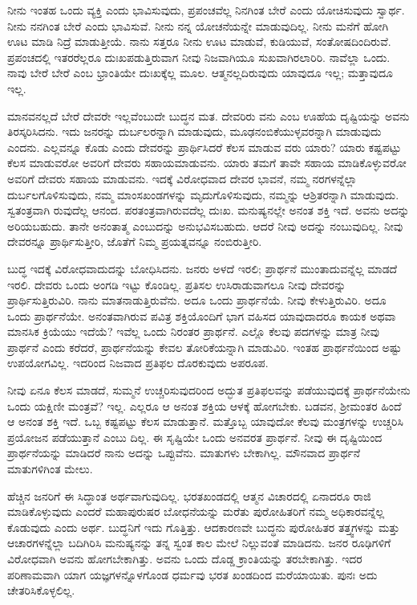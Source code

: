 ನೀನು ಇಂತಹ ಒಂದು ವ್ಯಕ್ತಿ ಎಂದು ಭಾವಿಸುವುದು, ಪ್ರಪಂಚವೆಲ್ಲ ನಿನಗಿಂತ ಬೇರೆ ಎಂದು ಯೋಚಿಸುವುದು ಸ್ವಾರ್ಥ. ನೀನು ನನಗಿಂತ ಬೇರೆ ಎಂದು ಭಾವಿಸುವೆ. ನೀನು ನನ್ನ ಯೋಚನೆಯನ್ನೇ ಮಾಡುವುದಿಲ್ಲ. ನೀನು ಮನೆಗೆ ಹೋಗಿ ಊಟ ಮಾಡಿ ನಿದ್ರೆ ಮಾಡುತ್ತೀಯೆ. ನಾನು ಸತ್ತರೂ ನೀನು ಊಟ ಮಾಡುವೆ, ಕುಡಿಯುವೆ, ಸಂತೋಷದಿಂದಿರುವೆ. ಪ್ರಪಂಚದಲ್ಲಿ ಇತರರೆಲ್ಲರೂ ದುಃಖಪಡುತ್ತಿರುವಾಗ ನೀವು ನಿಜವಾಗಿಯೂ ಸುಖವಾಗಿರಲಾರಿರಿ. ನಾವೆಲ್ಲಾ ಒಂದು. ನಾವು ಬೇರೆ ಬೇರೆ ಎಂಬ ಭ್ರಾಂತಿಯೇ ದುಃಖಕ್ಕೆಲ್ಲ ಮೂಲ. ಆತ್ಮನಲ್ಲದಿರುವುದು ಯಾವುದೂ ಇಲ್ಲ; ಮತ್ತಾವುದೂ ಇಲ್ಲ.

ಮಾನವನಲ್ಲದೆ ಬೇರೆ ದೇವರೇ ಇಲ್ಲವೆಂಬುದೇ ಬುದ್ಧನ ಮತ. ದೇವರಿರು ವನು ಎಂಬ ಊಹೆಯ ದೃಷ್ಟಿಯನ್ನು ಅವನು ತಿರಸ್ಕರಿಸಿದನು. ಇದು ಜನರನ್ನು ದುರ್ಬಲರನ್ನಾಗಿ ಮಾಡುವುದು, ಮೂಢನಂಬಿಕೆಯುಳ್ಳವರನ್ನಾಗಿ ಮಾಡುವುದು ಎಂದನು. ಎಲ್ಲವನ್ನೂ ಕೊಡು ಎಂದು ದೇವರನ್ನು ಪ್ರಾರ್ಥಿಸಿದರೆ ಕೆಲಸ ಮಾಡುವ ವರು ಯಾರು? ಯಾರು ಕಷ್ಟಪಟ್ಟು ಕೆಲಸ ಮಾಡುವರೋ ಅವರಿಗೆ ದೇವರು ಸಹಾಯಮಾಡುವನು. ಯಾರು ತಮಗೆ ತಾವೇ ಸಹಾಯ ಮಾಡಿಕೊಳ್ಳುವರೋ ಅವರಿಗೆ ದೇವರು ಸಹಾಯ ಮಾಡುವನು. ಇದಕ್ಕೆ ವಿರೋಧವಾದ ದೇವರ ಭಾವನೆ, ನಮ್ಮ ನರಗಳನ್ನೆಲ್ಲಾ ದುರ್ಬಲಗೊಳಿಸುವುದು, ನಮ್ಮ ಮಾಂಸಖಂಡಗಳನ್ನು ಮೃದುಗೊಳಿಸುವುದು, ನಮ್ಮನ್ನು ಆಶ್ರಿತರನ್ನಾಗಿ ಮಾಡುವುದು. ಸ್ವತಂತ್ರವಾಗಿ ರುವುದೆಲ್ಲ ಆನಂದ. ಪರತಂತ್ರವಾಗಿರುವದೆಲ್ಲ ದುಃಖ. ಮನುಷ್ಯನಲ್ಲೇ ಅನಂತ ಶಕ್ತಿ ಇದೆ. ಅವನು ಅದನ್ನು ಅರಿಯಬಹುದು. ತಾನೇ ಅನಂತಾತ್ಮ ಎಂಬುದನ್ನು ಅನುಭವಿಸಬಹುದು. ಆದರೆ ನೀವು ಅದನ್ನು ನಂಬುವುದಿಲ್ಲ. ನೀವು ದೇವರನ್ನೂ ಪ್ರಾರ್ಥಿಸುತ್ತೀರಿ, ಜೊತೆಗೆ ನಿಮ್ಮ ಪ್ರಯತ್ನವನ್ನೂ ನಂಬಿರುತ್ತೀರಿ.

ಬುದ್ಧ ಇದಕ್ಕೆ ವಿರೋಧವಾದುದನ್ನು ಬೋಧಿಸಿದನು. ಜನರು ಅಳದೆ ಇರಲಿ; ಪ್ರಾರ್ಥನೆ ಮುಂತಾದುವನ್ನೆಲ್ಲ ಮಾಡದೆ ಇರಲಿ. ದೇವರು ಒಂದು ಅಂಗಡಿ ಇಟ್ಟು ಕೊಂಡಿಲ್ಲ. ಪ್ರತಿಸಲ ಉಸಿರಾಡುವಾಗಲೂ ನೀವು ದೇವರನ್ನು ಪ್ರಾರ್ಥಿಸುತ್ತಿರುವಿರಿ. ನಾನು ಮಾತನಾಡುತ್ತಿರುವೆನು. ಅದೂ ಒಂದು ಪ್ರಾರ್ಥನೆಯೆ. ನೀವು ಕೇಳುತ್ತಿರುವಿರಿ. ಅದೂ ಒಂದು ಪ್ರಾರ್ಥನೆಯೇ. ಅನಂತವಾಗಿರುವ ಪವಿತ್ರ ಶಕ್ತಿಯೊಂದಿಗೆ ಭಾಗ ವಹಿಸದ ಯಾವುದಾದರೂ ಕಾಯಕ ಅಥವಾ ಮಾನಸಿಕ ಕ್ರಿಯೆಯು ಇದೆಯೆ? ಇವೆಲ್ಲ ಒಂದು ನಿರಂತರ ಪ್ರಾರ್ಥನೆ. ಎಲ್ಲೊ ಕೆಲವು ಪದಗಳನ್ನು ಮಾತ್ರ ನೀವು ಪ್ರಾರ್ಥನೆ ಎಂದು ಕರೆದರೆ, ಪ್ರಾರ್ಥನೆಯನ್ನು ಕೇವಲ ತೋರಿಕೆಯನ್ನಾಗಿ ಮಾಡುವಿರಿ. ಇಂತಹ ಪ್ರಾರ್ಥನೆಯಿಂದ ಅಷ್ಟು ಉಪಯೋಗವಿಲ್ಲ. ಇದರಿಂದ ನಿಜವಾದ ಪ್ರತಿಫಲ ದೊರಕುವುದು ಅಪರೂಪ.

ನೀವು ಏನೂ ಕೆಲಸ ಮಾಡದೆ, ಸುಮ್ಮನೆ ಉಚ್ಚರಿಸುವುದರಿಂದ ಅದ್ಭುತ ಪ್ರತಿಫಲವನ್ನು ಪಡೆಯುವುದಕ್ಕೆ ಪ್ರಾರ್ಥನೆಯೇನು ಒಂದು ಯಕ್ಷಿಣೀ ಮಂತ್ರವೆ? ಇಲ್ಲ. ಎಲ್ಲರೂ ಆ ಅನಂತ ಶಕ್ತಿಯ ಆಳಕ್ಕೆ ಹೋಗಬೇಕು. ಬಡವನ, ಶ‍್ರೀಮಂತರ ಹಿಂದೆ ಆ ಅನಂತ ಶಕ್ತಿ ಇದೆ. ಒಬ್ಬ ಕಷ್ಟಪಟ್ಟು ಕೆಲಸ ಮಾಡುತ್ತಾನೆ. ಮತ್ತೊಬ್ಬ ಯಾವುದೋ ಕೆಲವು ಮಂತ್ರಗಳನ್ನು ಉಚ್ಚರಿಸಿ ಪ್ರಯೋಜನ ಪಡೆಯುತ್ತಾನೆ ಎಂಬು ದಿಲ್ಲ. ಈ ಸೃಷ್ಟಿಯೇ ಒಂದು ಅನವರತ ಪ್ರಾರ್ಥನೆ. ನೀವು ಈ ದೃಷ್ಟಿಯಿಂದ ಪ್ರಾರ್ಥನೆಯನ್ನು ಮಾಡಿದರೆ ನಾನು ಅದನ್ನು ಒಪ್ಪುವೆನು. ಮಾತುಗಳು ಬೇಕಾಗಿಲ್ಲ. ಮೌನವಾದ ಪ್ರಾರ್ಥನೆ ಮಾತುಗಳಿಗಿಂತ ಮೇಲು.

ಹೆಚ್ಚಿನ ಜನರಿಗೆ ಈ ಸಿದ್ಧಾಂತ ಅರ್ಥವಾಗುವುದಿಲ್ಲ. ಭರತಖಂಡದಲ್ಲಿ ಆತ್ಮನ ವಿಚಾರದಲ್ಲಿ ಏನಾದರೂ ರಾಜಿ ಮಾಡಿಕೊಳ್ಳುವುದು ಎಂದರೆ ಮಹಾಪುರುಷರ ಬೋಧನೆಯನ್ನು ಮರೆತು ಪುರೋಹಿತರಿಗೆ ನಮ್ಮ ಅಧಿಕಾರವನ್ನೆಲ್ಲ ಕೊಡುವುದು ಎಂದು ಅರ್ಥ. ಬುದ್ಧನಿಗೆ ಇದು ಗೊತ್ತಿತ್ತು. ಆದಕಾರಣವೇ ಬುದ್ಧನು ಪುರೋಹಿತರ ತತ್ತ್ವಗಳನ್ನು ಮತ್ತು ಆಚಾರಗಳನ್ನೆಲ್ಲಾ ಬದಿಗಿರಿಸಿ ಮನುಷ್ಯನನ್ನು ತನ್ನ ಸ್ವಂತ ಕಾಲ ಮೇಲೆ ನಿಲ್ಲುವಂತೆ ಮಾಡಿದನು. ಜನರ ರೂಢಿಗಳಿಗೆ ವಿರೋಧವಾಗಿ ಅವನು ಹೋಗಬೇಕಾಗಿತ್ತು. ಅವನು ಒಂದು ದೊಡ್ಡ ಕ್ರಾಂತಿಯನ್ನು ತರಬೇಕಾಗಿತ್ತು. ಇದರ ಪರಿಣಾಮವಾಗಿ ಯಾಗ ಯಜ್ಞಗಳನ್ನೊಳಗೊಂಡ ಧರ್ಮವು ಭರತ ಖಂಡದಿಂದ ಮರೆಯಾಯಿತು. ಪುನಃ ಅದು ಚೇತರಿಸಿಕೊಳ್ಳಲಿಲ್ಲ.

